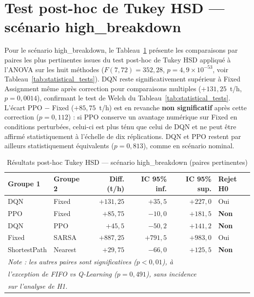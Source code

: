 \documentclass[11pt,a4paper]{report}
\begin{document}
\section*{Test post-hoc de Tukey HSD — scénario high\_breakdown}

Pour le scénario high\_breakdown, le Tableau~\ref{tab:tukey-highbreakdown}
présente les comparaisons par paires les plus pertinentes issues du
test post-hoc de Tukey HSD appliqué à l'ANOVA sur les huit méthodes
($F(7,72) = 352{,}28$, $p = 4{,}9 \times 10^{-53}$, voir Tableau~\ref{tab:statistical_tests}).
DQN reste significativement supérieur à Fixed Assignment même après
correction pour comparaisons multiples ($+131{,}25$~t/h,
$p = 0{,}0014$), confirmant le test de Welch du Tableau~\ref{tab:statistical_tests}.
L'écart PPO $-$ Fixed ($+85{,}75$~t/h) est en revanche \textbf{non
significatif} après cette correction ($p = 0{,}112$) : si PPO conserve
un avantage numérique sur Fixed en conditions perturbées, celui-ci est
plus ténu que celui de DQN et ne peut être affirmé statistiquement à
l'échelle de dix réplications. DQN et PPO restent par ailleurs
statistiquement équivalents ($p = 0{,}813$), comme en scénario nominal.

\begin{table}[H]
\centering
\caption{Résultats post-hoc Tukey HSD — scénario high\_breakdown (paires pertinentes)}
\label{tab:tukey-highbreakdown}
\small
\begin{tabular}{llrrrl}
\toprule
\textbf{Groupe 1} & \textbf{Groupe 2} & \textbf{Diff. (t/h)} & \textbf{IC 95\% inf.} & \textbf{IC 95\% sup.} & \textbf{Rejet H0} \\
\midrule
DQN   & Fixed   & $+131{,}25$ & $+35{,}5$  & $+227{,}0$ & Oui \\
PPO   & Fixed   & $+85{,}75$  & $-10{,}0$  & $+181{,}5$ & \textbf{Non} \\
DQN   & PPO     & $+45{,}5$   & $-50{,}2$  & $+141{,}2$ & \textbf{Non} \\
Fixed & SARSA   & $+887{,}25$ & $+791{,}5$ & $+983{,}0$ & Oui \\
ShortestPath & Nearest & $+29{,}75$ & $-66{,}0$ & $+125{,}5$ & \textbf{Non} \\
\midrule
\multicolumn{6}{l}{\textit{Note : les autres paires sont significatives ($p < 0{,}01$), à}} \\
\multicolumn{6}{l}{\textit{l'exception de FIFO vs Q-Learning ($p = 0{,}491$), sans incidence}} \\
\multicolumn{6}{l}{\textit{sur l'analyse de H1.}} \\
\bottomrule
\end{tabular}
\end{table}
\end{document}
